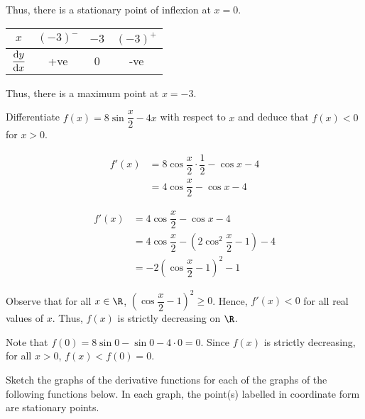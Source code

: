 \documentclass{echw}
\begin{document}
        Thus, there is a stationary point of inflexion at $x = 0$.

        \begin{table}[h]
            \centering
            \begin{tabular}{|c|c|c|c|}
            \hline
            $x$          & $(-3)^-$ & $-3$ & $(-3)^+$ \\\hline
            $\dfrac{\mathrm{d} y}{\mathrm{d} x}$ & +ve   & 0 & -ve   \\[1ex]\hline
            \end{tabular}
        \end{table}

        Thus, there is a maximum point at $x=-3$.


    \problem{}
        Differentiate $f(x) = 8\sin \dfrac{x}2 - 4x$ with respect to $x$ and deduce that $f(x) < 0$ for $x>0$.

    \solution
        \begin{align*}
            f'(x) &= 8\cos \dfrac{x}2 \cdot \dfrac12 - \cos x - 4\\
            &= 4\cos\dfrac{x}2 - \cos x- 4
        \end{align*}


        \begin{align*}
            f'(x) &= 4\cos\dfrac{x}2 - \cos x- 4\\
            &= 4\cos \dfrac{x}2 - (2\cos^2 \dfrac{x}2 - 1) - 4\\
            &= -2\left(\cos\dfrac{x}2 - 1\right)^2 - 1
        \end{align*}

        Observe that for all $x \in \R$, $\left(\cos\dfrac{x}2 - 1\right)^2 \geq 0$. Hence, $f'(x) < 0$ for all real values of $x$. Thus, $f(x)$ is strictly decreasing on $\R$.

        Note that $f(0) = 8\sin 0 - \sin 0 - 4 \cdot 0 = 0$. Since $f(x)$ is strictly decreasing, for all $x > 0$, $f(x) < f(0) = 0$.

    \problem{}
        Sketch the graphs of the derivative functions for each of the graphs of the following functions below. In each graph, the point(s) labelled in coordinate form are stationary points.
\end{document}
